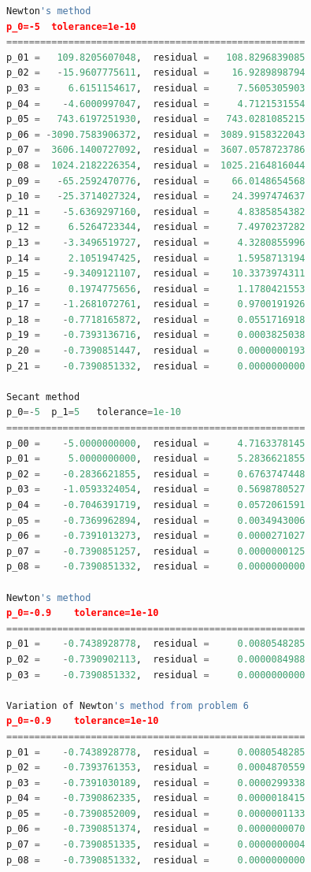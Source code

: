 \documentclass{article}
\begin{document}
\begin{lstlisting}[language=Python]
Newton's method
p_0=-5	tolerance=1e-10
=====================================================
p_01 =   109.8205607048,  residual =   108.8296839085
p_02 =   -15.9607775611,  residual =    16.9289898794
p_03 =     6.6151154617,  residual =     7.5605305903
p_04 =    -4.6000997047,  residual =     4.7121531554
p_05 =   743.6197251930,  residual =   743.0281085215
p_06 = -3090.7583906372,  residual =  3089.9158322043
p_07 =  3606.1400727092,  residual =  3607.0578723786
p_08 =  1024.2182226354,  residual =  1025.2164816044
p_09 =   -65.2592470776,  residual =    66.0148654568
p_10 =   -25.3714027324,  residual =    24.3997474637
p_11 =    -5.6369297160,  residual =     4.8385854382
p_12 =     6.5264723344,  residual =     7.4970237282
p_13 =    -3.3496519727,  residual =     4.3280855996
p_14 =     2.1051947425,  residual =     1.5958713194
p_15 =    -9.3409121107,  residual =    10.3373974311
p_16 =     0.1974775656,  residual =     1.1780421553
p_17 =    -1.2681072761,  residual =     0.9700191926
p_18 =    -0.7718165872,  residual =     0.0551716918
p_19 =    -0.7393136716,  residual =     0.0003825038
p_20 =    -0.7390851447,  residual =     0.0000000193
p_21 =    -0.7390851332,  residual =     0.0000000000

Secant method
p_0=-5	p_1=5	tolerance=1e-10
=====================================================
p_00 =    -5.0000000000,  residual =     4.7163378145
p_01 =     5.0000000000,  residual =     5.2836621855
p_02 =    -0.2836621855,  residual =     0.6763747448
p_03 =    -1.0593324054,  residual =     0.5698780527
p_04 =    -0.7046391719,  residual =     0.0572061591
p_05 =    -0.7369962894,  residual =     0.0034943006
p_06 =    -0.7391013273,  residual =     0.0000271027
p_07 =    -0.7390851257,  residual =     0.0000000125
p_08 =    -0.7390851332,  residual =     0.0000000000

Newton's method
p_0=-0.9	tolerance=1e-10
=====================================================
p_01 =    -0.7438928778,  residual =     0.0080548285
p_02 =    -0.7390902113,  residual =     0.0000084988
p_03 =    -0.7390851332,  residual =     0.0000000000

Variation of Newton's method from problem 6
p_0=-0.9	tolerance=1e-10
=====================================================
p_01 =    -0.7438928778,  residual =     0.0080548285
p_02 =    -0.7393761353,  residual =     0.0004870559
p_03 =    -0.7391030189,  residual =     0.0000299338
p_04 =    -0.7390862335,  residual =     0.0000018415
p_05 =    -0.7390852009,  residual =     0.0000001133
p_06 =    -0.7390851374,  residual =     0.0000000070
p_07 =    -0.7390851335,  residual =     0.0000000004
p_08 =    -0.7390851332,  residual =     0.0000000000


\end{lstlisting}
\end{document}
